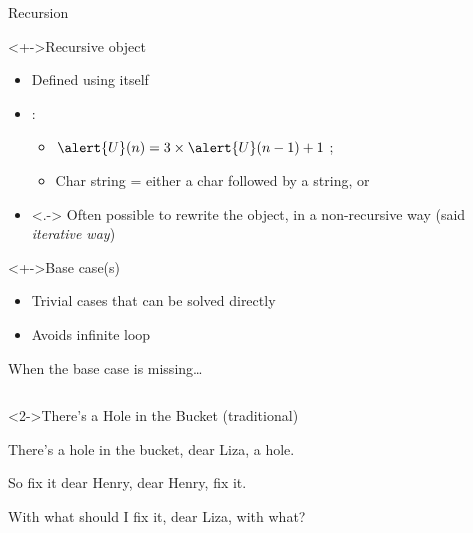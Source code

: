 \begin{Coupe}
\begin{frame}{Recursion}
  \begin{block}<+->{Recursive object}
    \begin{itemize}
    \item \alert{Defined using itself}
    \item<+-> :
      \begin{itemize}
      \item $\alert{U}(n)=3\times \alert{U}(n-1)+1$ ; 
      \item Char \alert{string} = either a char followed by a \alert{string},
        or   
      \end{itemize}
    \item<.-> Often possible to rewrite the object, in a non-recursive way
      {\small(said \textit{iterative way})}
      \medskip
    \end{itemize}
  \end{block}

  \begin{block}<+->{Base case(s)}
    \begin{itemize}
    \item Trivial cases that can be solved directly
    \item Avoids infinite loop
    \end{itemize}
  \end{block}
\end{frame}
\begin{frame}{When the base case is missing\ldots}
  \begin{columns}
    \begin{column}{.55\linewidth}
      \begin{block}<2->{There's a Hole in the Bucket {\small(traditional)}}
        {\footnotesize%
          There's a hole in the bucket, dear Liza, a \alert{hole}.
          
          So fix it dear Henry, dear Henry, fix it.
          
          With what should I fix it, dear Liza, with what?

}
\end{block}
\end{column}
\end{columns}
\end{frame}
\end{Coupe}
